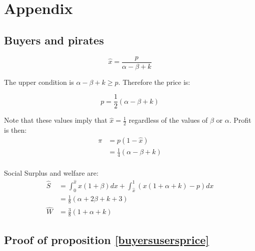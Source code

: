 \newpage

\section{Appendix}

\subsection{Buyers and pirates}
\begin{equation*}
\hat{x} = \frac{p}{\alpha-\beta + k}
\end{equation*}

The upper condition is $\alpha-\beta+k \geq p$. Therefore the price is:

\begin{equation*}
p = \frac{1}{2}\left(
\alpha-\beta+k
\right)
\end{equation*}

Note that these values imply that $\hat{x} = \frac{1}{2}$ regardless of the values of $\beta$ or $\alpha$. Profit is then:
\begin{align*}
\pi &= p(1-\hat{x}) \\
&=  \frac{1}{4}\left(
\alpha-\beta+k
\right)  \\
\end{align*}

Social Surplus and welfare are:
\begin{align*}
\hat{S} &= \int_0^{\hat{x}}x(1+\beta)dx+
\int_{\hat{x}}^{1}\left( x(1+\alpha+k)-p \right)dx \\
&= \frac{1}{8} (\alpha+2 \beta+k+3) \\
\hat{W} &= \frac{3}{8} \left( 1 + \alpha +k
\right)
\end{align*}



\subsection{Proof of proposition \ref{buyersusersprice}} \label{buyersuserspriceproof}


